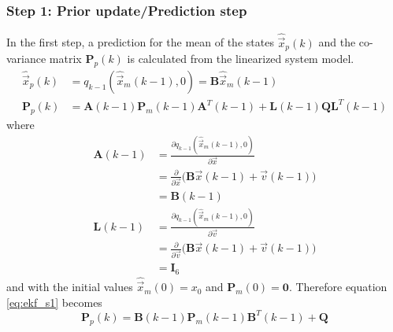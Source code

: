 \subsubsection{Step 1: Prior update/Prediction step}
In the first step, a prediction for the mean of the states $\hat{\vec x}_p(k)$ and the co-variance matrix $\textbf{P}_p(k)$ is calculated from the linearized system model.
\begin{align}
  \hat{\vec x}_p(k) &=  q_{k-1}(\hat{\vec x}_m(k-1), 0) = \textbf{B} \hat{\vec x}_m(k-1)\\
	\textbf{P}_p(k) &= {\textbf{A}}(k-1) \textbf{P}_m(k-1) {\textbf{A}}^T(k-1) + \textbf{L}(k-1) \textbf{Q} \textbf{L}^T(k-1) \label{eq:ekf_s1}
\end{align}
where
\begin{align}
  \textbf{A}(k-1) & = \frac{\partial q_{k-1}(\hat{\vec x}_m(k-1), 0)}{\partial \vec x}\\
  & =  \frac{\partial}{\partial \vec x} \big(\textbf{B} \vec x(k-1) + \vec v(k-1)\big)\\
	& = \textbf{B}(k-1)\\
  \textbf{L}(k-1) & = \frac{\partial q_{k-1}(\hat{\vec x}_m(k-1), 0)}{\partial \vec v}\\
  & = \frac{\partial}{\partial \vec v} \big( \textbf{B} \vec x(k-1) + \vec v(k-1)\big)\\
	& = \textbf{I}_6
\end{align}
and with the initial values $\hat{\vec x}_m(0) = x_0$ and $\textbf{P}_m(0) = \textbf{0}$.
Therefore equation \ref{eq:ekf_s1} becomes
$$\textbf{P}_p(k) = \textbf{B}(k-1)\textbf{P}_m(k-1)\textbf{B}^{T}(k-1) + \textbf{Q}$$

